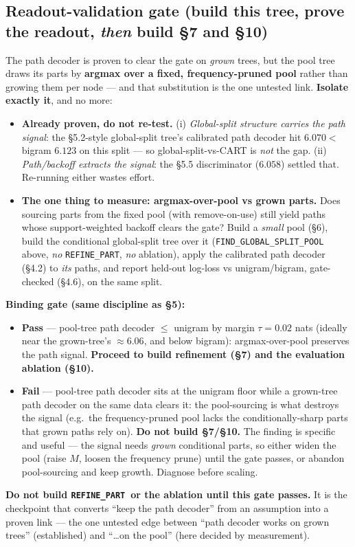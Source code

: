 \documentclass[11pt]{article}
\newcommand{\code}[1]{\texttt{#1}}
\newcommand{\refine}{\code{REFINE\_PART}}
\begin{document}
\subsection{Readout-validation gate (build this tree, prove the readout, \emph{then} build \S7 and \S10)}
The path decoder is proven to clear the gate on \emph{grown} trees, but the pool tree draws its parts by \textbf{argmax over a fixed, frequency-pruned pool} rather than growing them per node --- and that substitution is the one untested link. \textbf{Isolate exactly it}, and no more:
\begin{itemize}[nosep]
\item \textbf{Already proven, do not re-test.} (i) \emph{Global-split structure carries the path signal}: the \S5.2-style global-split tree's calibrated path decoder hit $6.070<$ bigram $6.123$ on this split --- so global-split-vs-CART is \emph{not} the gap. (ii) \emph{Path/backoff extracts the signal}: the \S5.5 discriminator ($6.058$) settled that. Re-running either wastes effort.
\item \textbf{The one thing to measure: argmax-over-pool vs grown parts.} Does sourcing parts from the fixed pool (with remove-on-use) still yield paths whose support-weighted backoff clears the gate? Build a \emph{small} pool (\S6), build the conditional global-split tree over it (\code{FIND\_GLOBAL\_SPLIT\_POOL} above, \emph{no} \refine, \emph{no} ablation), apply the calibrated path decoder (\S4.2) to \emph{its} paths, and report held-out log-loss vs unigram/bigram, gate-checked (\S4.6), on the same split.
\end{itemize}

\noindent\textbf{Binding gate (same discipline as \S5):}
\begin{itemize}[nosep]
\item \textbf{Pass} --- pool-tree path decoder $\le$ unigram by margin $\tau=0.02$ nats (ideally near the grown-tree's $\approx6.06$, and below bigram): argmax-over-pool preserves the path signal. \textbf{Proceed to build refinement (\S7) and the evaluation ablation (\S10).}
\item \textbf{Fail} --- pool-tree path decoder sits at the unigram floor while a grown-tree path decoder on the same data clears it: the pool-sourcing is what destroys the signal (e.g.\ the frequency-pruned pool lacks the conditionally-sharp parts that grown paths rely on). \textbf{Do not build \S7/\S10.} The finding is specific and useful --- the signal needs \emph{grown} conditional parts, so either widen the pool (raise $M$, loosen the frequency prune) until the gate passes, or abandon pool-sourcing and keep growth. Diagnose before scaling.
\end{itemize}
\textbf{Do not build \refine\ or the ablation until this gate passes.} It is the checkpoint that converts ``keep the path decoder'' from an assumption into a proven link --- the one untested edge between ``path decoder works on grown trees'' (established) and ``\dots on the pool'' (here decided by measurement).
\end{document}
